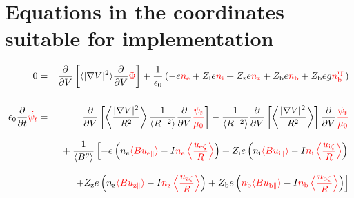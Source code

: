 \documentclass[11pt]{article}
\def\r#1{{\rm#1}}
\def\ave#1{\left\langle#1\right\rangle}
\def\aves#1{\langle#1\rangle}
\def\dd#1#2{\frac{\partial #1}{\partial #2}}
\def\para{\parallel}
\def\ddV{\frac{\partial}{\partial V}}
\def\ddt{\frac{\partial}{\partial t}}
\def\psid{\dot{\psi}}
\def\psit{\psi_t}
\def\psitd{\dot{\psit}}
\def\nee{n_\r{e}}
\def\ni{n_\r{i}}
\def\nz{n_\r{z}}
\def\nb{n_\r{b}}
\def\Zi{Z_\r{i}}
\def\Zz{Z_\r{z}}
\def\Zb{Z_\r{b}}
\def\uzt#1{u_{\r{#1}\zeta}}
\def\upara#1{u_{\r{#1}\para}}
\def\nbrp{n_\r{b}^\r{rp}}
\def\red#1{\textcolor{red}{#1}}
\begin{document}
\bigskip

\section{Equations in the coordinates suitable for implementation}
\setcounter{equation}{0}

\begin{eqnarray}
  0 &=&
%
    \ddV \left[ \aves{|\nabla V|^2} \ddV{\red{\Phi}} \right]
%
  + \frac{1}{\epsilon_0}
%
    \left(-e \red{\nee} + \Zi e \red{\ni} + \Zz e \red{\nz} + \Zb e \red{\nb} + \Zb e g \red{\nbrp} \right)
\\[5mm]
%
  \epsilon_0 \ddt \red{\psitd} &=&
%
     \ddV \left[ \ave{\frac{|\nabla V|^2}{R^2}} \frac{1}{\aves{R^{-2}}} \ddV \red{\frac{\psit}{\mu_0}} \right]
   - \frac{1}{\aves{R^{-2}}} \ddV \left[ \ave{\frac{|\nabla V|^2}{R^2}}
				  \right] \ddV  \red{\frac{\psit}{\mu_0}}
 \nonumber\\[3mm]&&{}
%
  + \frac{1}{\aves{B^\theta}}
%
    \left[-     e \left( \nee \red{\aves{B\upara{e}}} - I\red{\nee \ave{\frac{\uzt{e}}{R}}} \right)
          + \Zi e \left( \ni  \red{\aves{B\upara{i}}} - I\red{\ni  \ave{\frac{\uzt{i}}{R}}} \right)
    \right.\nonumber\\[3mm]&&{}
    \left.+ \Zz e \left( \nz  \red{\aves{B\upara{z}}} - I\red{\nz  \ave{\frac{\uzt{z}}{R}}} \right)
          + \Zb e  \left( \red{\nb \aves{B\upara{b}}} - I\red{\nb  \ave{\frac{\uzt{b}}{R}}} \right) \right]
\\[5mm]

\end{eqnarray}
\end{document}
